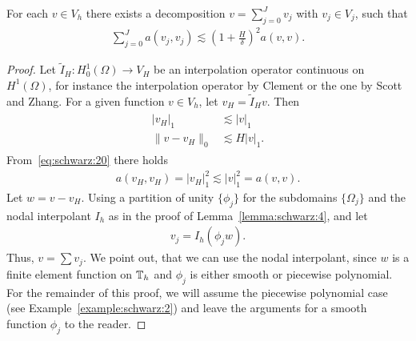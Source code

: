 \begin{lemma}
  \label{lemma:schwarz:stable-decomposition}
  For each $v\in V_h$ there exists a decomposition $v=\sum_{j=0}^J
  v_j$ with $v_j\in V_j$, such that
  \begin{gather}
    \label{eq:schwarz:13}
    \sum_{j=0}^J a(v_j, v_j)
    \lesssim \left(1+\frac H\delta\right)^2 a(v,v).
  \end{gather}
\end{lemma}

\begin{proof}
  Let $\tilde I_H: H^1_0(\Omega) \to V_H$ be an interpolation operator
  continuous on $H^1(\Omega)$, for instance the interpolation operator
  by Clement or the one by Scott and Zhang. For a given function
  $v\in V_h$, let $v_H = \tilde I_H v$. Then
  \begin{gather}
    \label{eq:schwarz:20}
    \begin{split}
      |v_H|_1 &\lesssim |v|_1 \\
      \|v-v_H\|_0 &\lesssim H |v|_1.
    \end{split}
  \end{gather}
  From~\eqref{eq:schwarz:20} there holds
  \begin{gather}
    \label{eq:schwarz:22}
    a(v_H,v_H) = |v_H|_1^2 \lesssim |v|_1^2 = a(v,v).
  \end{gather}
  Let $w=v-v_H$. Using a partition of unity $\{\phi_j\}$ for the
  subdomains $\{\Omega_j\}$ and the nodal interpolant $I_h$ as in the
  proof of Lemma~\ref{lemma:schwarz:4}, and let
  \begin{gather*}
    v_j = I_h(\phi_j w).
  \end{gather*}
  Thus, $v = \sum v_j$. We point out, that we can use the nodal
  interpolant, since $w$ is a finite element function on $\mathbb T_h$ and
  $\phi_j$ is either smooth or piecewise polynomial. For the remainder
  of this proof, we will assume the piecewise polynomial case (see
  Example~\ref{example:schwarz:2}) and leave the arguments for a
  smooth function $\phi_j$ to the reader.
  

\end{proof}

